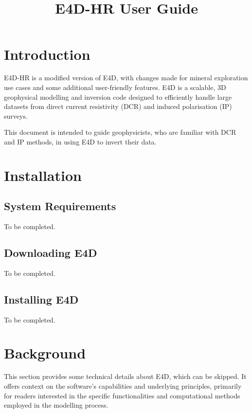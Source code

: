 \documentclass[a4paper,12pt]{article}
\title{E4D-HR User Guide}
\date{}
\begin{document}
\maketitle



\tableofcontents

\newpage

\section{Introduction}

E4D-HR is a modified version of E4D, with changes made for mineral exploration use cases and some additional user-friendly features. E4D is a scalable, 3D geophysical modelling and inversion code designed to efficiently handle large datasets from direct current resistivity (DCR) and induced polarisation (IP) surveys.

This document is intended to guide geophysicists, who are familiar with DCR and IP methods, in using E4D to invert their data.

\section{Installation}

\subsection{System Requirements}
To be completed.

\subsection{Downloading E4D}
To be completed.

\subsection{Installing E4D} \label{install}
To be completed.

\section{Background}

This section provides some technical details about E4D, which can be skipped. It offers context on the software’s capabilities and underlying principles, primarily for readers interested in the specific functionalities and computational methods employed in the modelling process.
\end{document}
